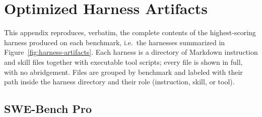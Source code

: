 \section{Optimized Harness Artifacts}\label{app:artifacts}

This appendix reproduces, verbatim, the complete contents of the highest-scoring harness \method{} produced on each benchmark, i.e.\ the harnesses summarized in Figure~\ref{fig:harness-artifacts}. Each harness is a directory of Markdown instruction and skill files together with executable tool scripts; every file is shown in full, with no abridgement. Files are grouped by benchmark and labeled with their path inside the harness directory and their role (instruction, skill, or tool).

\subsection{SWE-Bench Pro}

